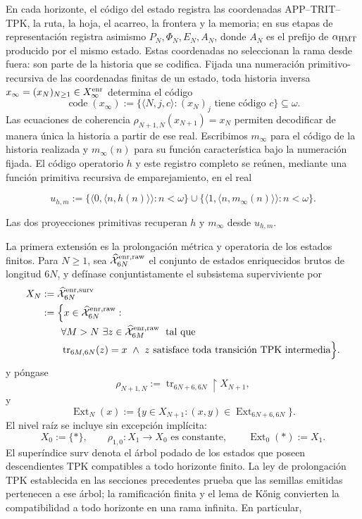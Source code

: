 En cada horizonte, el código del estado registra las coordenadas APP--TRIT--TPK,
la ruta, la hoja, el acarreo, la frontera y la memoria; en sus etapas de
representación registra asimismo \(P_N,\Phi_N,E_N,A_N\), donde
\(A_N\) es el prefijo de \(\alpha_{\rm HMT}\) producido por el mismo estado.
Estas coordenadas no seleccionan la rama desde fuera: son parte de la historia
que se codifica. Fijada una numeración primitivo-recursiva de las coordenadas finitas de
un estado, toda historia inversa
\(x_\infty=(x_N)_{N\geq1}\in X_\infty^{\rm enr}\) determina el código
\[
 \operatorname{code}(x_\infty)
 :=\{\langle N,j,c\rangle:(x_N)_j\text{ tiene código }c\}\subseteq\omega.
\]
Las ecuaciones de coherencia
\(\rho_{N+1,N}(x_{N+1})=x_N\) permiten decodificar de manera única la
historia a partir de ese real. Escribimos \(m_\infty\) para el código de la
historia realizada y \(m_\infty(n)\) para su función característica bajo la
numeración fijada. El código operatorio \(h\) y este registro completo se
reúnen, mediante una función primitiva recursiva de emparejamiento, en el real

\[
 u_{h,m}:=
 \{\langle0,\langle n,h(n)\rangle\rangle:n<\omega\}
 \cup
 \{\langle1,\langle n,m_\infty(n)\rangle\rangle:n<\omega\}.
\tag{33a}\label{eq:ch-codigo-conjunto}
\]

Las dos proyecciones primitivas recuperan \(h\) y \(m_\infty\) desde
\(u_{h,m}\).

La primera extensión es la prolongación métrica y operatoria de los estados
finitos. Para \(N\ge1\), sea
\(\widehat{\mathcal X}^{\rm enr,raw}_{6N}\) el conjunto de estados
enriquecidos brutos de longitud \(6N\), y defínase conjuntistamente el
subsistema superviviente por
\[
\begin{aligned}
 X_N
 &:=\widehat{\mathcal X}^{\rm enr,surv}_{6N}\\
 &:=\Bigl\{x\in\widehat{\mathcal X}^{\rm enr,raw}_{6N}:\\[-.2ex]
 &\qquad\forall M>N\ \exists z\in
   \widehat{\mathcal X}^{\rm enr,raw}_{6M}\;\text{ tal que}\\[-.2ex]
 &\qquad\operatorname{tr}_{6M,6N}(z)=x\ \wedge\
   z\text{ satisface toda transición TPK intermedia}\Bigr\}.
\end{aligned}
\]
y póngase
\[
 \rho_{N+1,N}:=\operatorname{tr}_{6N+6,6N}\!\upharpoonright X_{N+1},
\]
y
\[
 \operatorname{Ext}_N(x):=
 \{y\in X_{N+1}:(x,y)\in
 \operatorname{Ext}_{6N+6,6N}\}.
\]
El nivel raíz se incluye sin excepción implícita:
\[
 X_0:=\{\ast\},\qquad
 \rho_{1,0}:X_1\to X_0\text{ es constante},\qquad
 \operatorname{Ext}_0(\ast):=X_1.
\]
El superíndice \(\mathrm{surv}\) denota el
árbol podado de los estados que poseen descendientes TPK compatibles a todo
horizonte finito. La ley de prolongación TPK establecida en las secciones
precedentes prueba que las semillas
emitidas pertenecen a ese árbol; la ramificación finita y el lema de Kőnig
convierten la compatibilidad a todo horizonte en una rama infinita. En
particular,

